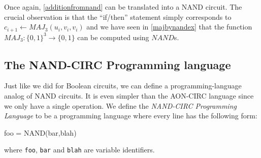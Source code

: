 
Once again, \cref{additionfromnand} can be translated into a NAND
circuit. The crucial observation is that the ``if/then'' statement
simply corresponds to
\(c_{i+1} \leftarrow \ensuremath{\mathit{MAJ}}_3(u_i,v_i,v_i)\) and we
have seen in \cref{majbynandex} that the function
\(\ensuremath{\mathit{MAJ}}_3:\{0,1\}^3 \rightarrow \{0,1\}\) can be
computed using \(\ensuremath{\mathit{NAND}}\)s.

\subsection{The NAND-CIRC Programming language}\label{nandcircsec}

Just like we did for Boolean circuits, we can define a
programming-language analog of NAND circuits. It is even simpler than
the AON-CIRC language since we only have a single operation. We define
the \emph{NAND-CIRC Programming Language} to be a programming language
where every line has the following form:

\begin{code}
foo = NAND(bar,blah)
\end{code}

where \texttt{foo}, \texttt{bar} and \texttt{blah} are variable
identifiers.

\hypertarget{NANDprogramexample}{}


